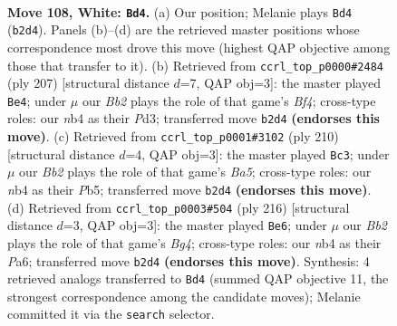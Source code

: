 \documentclass[11pt]{article}
\begin{document}
\clearpage

\begin{figure}[p]\centering
\begin{subfigure}{0.46\textwidth}\centering
\resizebox{\linewidth}{!}{%
\newchessgame
\chessboard[
  setfen={b7/8/8/8/1n5k/8/1B3P2/6K1 w - - 61 108},
  showmover=false,
  pgfstyle=straightmove, color=movearrow, markmove={b2-d4}
]}
\caption{}
\end{subfigure}\hfill
\begin{subfigure}{0.46\textwidth}\centering
\resizebox{\linewidth}{!}{%
\newchessgame
\chessboard[
  setfen={8/8/8/5b2/8/3p2k1/6p1/4K1B1 b - - 15 104},
  showmover=false,
  pgfstyle=straightmove, color=movearrow, markmove={f5-e4}
]}
\caption{}
\end{subfigure}
\\[4pt]
\begin{subfigure}{0.46\textwidth}\centering
\resizebox{\linewidth}{!}{%
\newchessgame
\chessboard[
  setfen={8/3k4/8/BPP5/3K4/8/8/7b w - - 87 106},
  showmover=false,
  pgfstyle=straightmove, color=movearrow, markmove={a5-c3}
]}
\caption{}
\end{subfigure}\hfill
\begin{subfigure}{0.46\textwidth}\centering
\resizebox{\linewidth}{!}{%
\newchessgame
\chessboard[
  setfen={8/4k3/P7/3P4/2K3B1/8/8/6b1 w - - 29 109},
  showmover=false,
  pgfstyle=straightmove, color=movearrow, markmove={g4-e6}
]}
\caption{}
\end{subfigure}
\caption{\textbf{Move 108, White: \texttt{Bd4}.} (a) Our position; Melanie plays \texttt{Bd4} (\texttt{b2d4}). Panels (b)--(d) are the retrieved master positions whose correspondence most drove this move (highest QAP objective among those that transfer to it). (b) Retrieved from \texttt{ccrl\_top\_p0000\#2484} (ply 207) [structural distance $d$=7, QAP obj=3]: the master played \texttt{Be4}; under $\mu$ our \emph{Bb2} plays the role of that game's \emph{Bf4}; cross-type roles: our \emph{n}b4 as their \emph{P}d3; transferred move \texttt{b2d4} \textbf{(endorses this move)}. (c) Retrieved from \texttt{ccrl\_top\_p0001\#3102} (ply 210) [structural distance $d$=4, QAP obj=3]: the master played \texttt{Bc3}; under $\mu$ our \emph{Bb2} plays the role of that game's \emph{Ba5}; cross-type roles: our \emph{n}b4 as their \emph{P}b5; transferred move \texttt{b2d4} \textbf{(endorses this move)}. (d) Retrieved from \texttt{ccrl\_top\_p0003\#504} (ply 216) [structural distance $d$=3, QAP obj=3]: the master played \texttt{Be6}; under $\mu$ our \emph{Bb2} plays the role of that game's \emph{Bg4}; cross-type roles: our \emph{n}b4 as their \emph{P}a6; transferred move \texttt{b2d4} \textbf{(endorses this move)}. Synthesis: 4 retrieved analogs transferred to \texttt{Bd4} (summed QAP objective 11, the strongest correspondence among the candidate moves); Melanie committed it via the \texttt{search} selector.}
\label{fig:thought-m214}
\end{figure}
\end{document}
